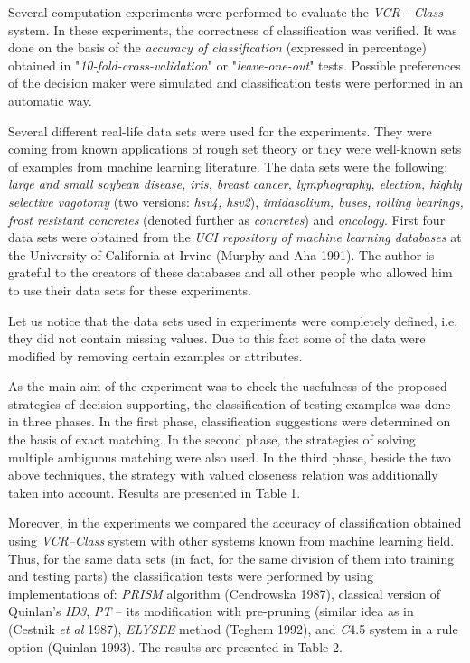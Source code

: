 Several computation experiments were performed to evaluate  the  {\it
VCR  -  Class}  system.  In  these   experiments,   the   correctness
of classification was verified. It  was  done on the  basis  of   the
{\it accuracy of classification}  (expressed  in  percentage) obtained
in "{\it 10-fold-cross-validation}" or "{\it leave-one-out}"  tests.
Possible preferences  of  the  decision  maker  were  simulated   and
classification tests were performed in an automatic way.

Several different real-life data sets  were used for the experiments.
They were coming from known  applications  of  rough  set  theory
or  they were well-known  sets  of  examples from
machine learning literature. The data sets  were  the  following:
{\it large and small soybean disease,  iris,  breast  cancer,
lymphography, election,  highly selective  vagotomy} (two   versions:
{\it hsv4, hsv2}),  {\it imidasolium, buses,  rolling   bearings,
frost  resistant  concretes} (denoted further as {\it concretes}) and
{\it oncology}. First  four  data  sets were obtained from  the  {\it
UCI repository of machine learning  databases} at the  University  of
California at Irvine (Murphy and Aha 1991).  The  author  is
grateful  to  the creators of these databases and all other people
who allowed  him  to use their data sets for these experiments.

Let us notice that the data sets used in experiments were  completely
defined, i.e. they did not contain  missing  values.  Due   to   this
fact  some  of  the  data   were   modified   by   removing   certain
examples  or attributes.

As the main aim of the experiment was to check the usefulness  of  the
proposed strategies of decision  supporting,  the  classification  of
testing examples  was  done  in  three  phases.  In  the  first phase,
classification suggestions were determined  on  the  basis  of  exact
matching. In the second phase, the  strategies  of  solving  multiple
ambiguous matching were also used. In the  third  phase,  beside the two
above techniques, the strategy with  valued  closeness  relation  was
additionally taken into account. Results are presented in Table 1.

Moreover,  in  the  experiments   we compared the accuracy
of classification obtained using  {\it  VCR--Class}    system    with
other systems known from machine learning  field.  Thus,   for    the
same  data sets (in fact, for the  same  division  of    them    into
training  and testing  parts)   the   classification    tests    were
performed by using  implementations  of:   {\it   PRISM}    algorithm
(Cendrowska 1987),  classical version of Quinlan's {\it ID3}, {\it PT}
-- its  modification  with   pre-pruning  (similar   idea    as    in
(Cestnik {\it et al} 1987),   {\it    ELYSEE}    method  (Teghem 1992),
  and   {\it C}4.5 system in  a  rule  option  (Quinlan  1993).  The
results are presented in Table 2.

